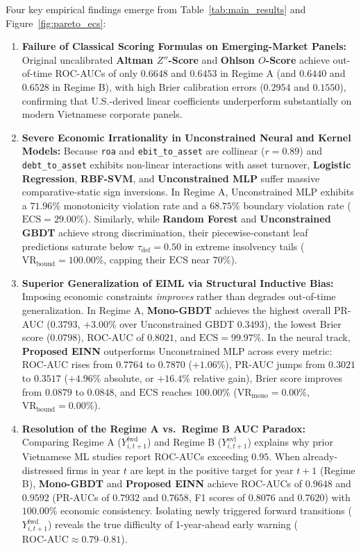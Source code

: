 \documentclass[11pt,a4paper]{article}
\begin{document}
Four key empirical findings emerge from Table~\ref{tab:main_results} and Figure~\ref{fig:pareto_ecs}:
\begin{enumerate}
    \item \textbf{Failure of Classical Scoring Formulas on Emerging-Market Panels:} Original uncalibrated \textbf{Altman $Z''$-Score} and \textbf{Ohlson $O$-Score} achieve out-of-time ROC-AUCs of only $0.6648$ and $0.6453$ in Regime A (and $0.6440$ and $0.6528$ in Regime B), with high Brier calibration errors ($0.2954$ and $0.1550$), confirming that U.S.-derived linear coefficients underperform substantially on modern Vietnamese corporate panels.
    \item \textbf{Severe Economic Irrationality in Unconstrained Neural and Kernel Models:} Because \texttt{roa} and \texttt{ebit\_to\_asset} are collinear ($r = 0.89$) and \texttt{debt\_to\_asset} exhibits non-linear interactions with asset turnover, \textbf{Logistic Regression}, \textbf{RBF-SVM}, and \textbf{Unconstrained MLP} suffer massive comparative-static sign inversions. In Regime A, Unconstrained MLP exhibits a $71.96\%$ monotonicity violation rate and a $68.75\%$ boundary violation rate ($\text{ECS} = 29.00\%$). Similarly, while \textbf{Random Forest} and \textbf{Unconstrained GBDT} achieve strong discrimination, their piecewise-constant leaf predictions saturate below $\tau_{\text{def}} = 0.50$ in extreme insolvency tails ($\text{VR}_{\text{bound}} = 100.00\%$, capping their $\text{ECS}$ near $70\%$).
    \item \textbf{Superior Generalization of EIML via Structural Inductive Bias:} Imposing economic constraints \textit{improves} rather than degrades out-of-time generalization. In Regime A, \textbf{Mono-GBDT} achieves the highest overall PR-AUC ($0.3793$, $+3.00\%$ over Unconstrained GBDT $0.3493$), the lowest Brier score ($0.0798$), ROC-AUC of $0.8021$, and $\text{ECS} = 99.97\%$. In the neural track, \textbf{Proposed EINN} outperforms Unconstrained MLP across every metric: ROC-AUC rises from $0.7764$ to $0.7870$ ($+1.06\%$), PR-AUC jumps from $0.3021$ to $0.3517$ ($+4.96\%$ absolute, or $+16.4\%$ relative gain), Brier score improves from $0.0879$ to $0.0848$, and $\text{ECS}$ reaches $100.00\%$ ($\text{VR}_{\text{mono}} = 0.00\%$, $\text{VR}_{\text{bound}} = 0.00\%$).
    \item \textbf{Resolution of the Regime A vs.\ Regime B AUC Paradox:} Comparing Regime A ($Y_{i,t+1}^{\text{fwd}}$) and Regime B ($Y_{i,t+1}^{\text{ovl}}$) explains why prior Vietnamese ML studies \citep[e.g.,][]{tran2022explainable} report ROC-AUCs exceeding $0.95$. When already-distressed firms in year $t$ are kept in the positive target for year $t+1$ (Regime B), \textbf{Mono-GBDT} and \textbf{Proposed EINN} achieve ROC-AUCs of $0.9648$ and $0.9592$ (PR-AUCs of $0.7932$ and $0.7658$, F1 scores of $0.8076$ and $0.7620$) with $100.00\%$ economic consistency. Isolating newly triggered forward transitions ($Y_{i,t+1}^{\text{fwd}}$) reveals the true difficulty of 1-year-ahead early warning ($\text{ROC-AUC} \approx 0.79\text{--}0.81$).
\end{enumerate}
\end{document}
